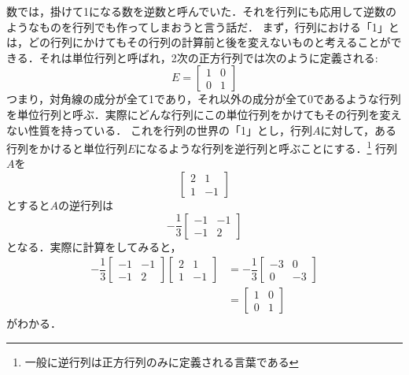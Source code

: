 \documentclass[a4paper,12pt,autodetect-engine,dvipdfmx]{jsarticle}
\theoremstyle{definition}
\begin{document}
数では，掛けて1になる数を逆数と呼んでいた．それを行列にも応用して逆数のようなものを行列でも作ってしまおうと言う話だ．
まず，行列における「1」とは，どの行列にかけてもその行列の計算前と後を変えないものと考えることができる．それは単位行列と呼ばれ，2次の正方行列では次のように定義される:
\begin{equation*}
    E = 
    \begin{bmatrix}
        1 & 0\\
        0 & 1
    \end{bmatrix}
\end{equation*}
つまり，対角線の成分が全て1であり，それ以外の成分が全て0であるような行列を単位行列と呼ぶ．実際にどんな行列にこの単位行列をかけてもその行列を変えない性質を持っている．
これを行列の世界の「1」とし，行列$A$に対して，ある行列をかけると単位行列$E$になるような行列を逆行列と呼ぶことにする．\footnote{一般に逆行列は正方行列のみに定義される言葉である}
行列$A$を
\begin{equation*}
    \begin{bmatrix}
        2 & 1\\
        1 & -1
    \end{bmatrix}
\end{equation*}
とすると$A$の逆行列は
\begin{equation*}
    - \dfrac{1}{3}
    \begin{bmatrix}
        -1 & -1\\
        -1 & 2
    \end{bmatrix}
\end{equation*}
となる．実際に計算をしてみると，
\begin{align*}
    - \dfrac{1}{3}
    \begin{bmatrix}
        -1 & -1\\
        -1 & 2
    \end{bmatrix}
    \begin{bmatrix}
        2 & 1\\
        1 & -1
    \end{bmatrix}
    &= 
    - \dfrac{1}{3}
    \begin{bmatrix}
        -3 & 0\\
        0 & -3
    \end{bmatrix}\\
    &= 
    \begin{bmatrix}
        1 & 0\\
        0 & 1
    \end{bmatrix}
\end{align*}
がわかる．
\end{document}

